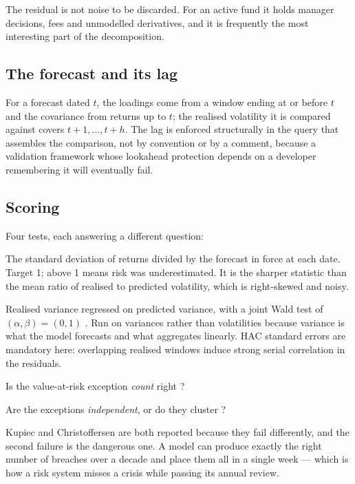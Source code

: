 \documentclass[11pt,a4paper]{article}
\begin{document}
The residual is not noise to be discarded. For an active fund it holds manager
decisions, fees and unmodelled derivatives, and it is frequently the most interesting
part of the decomposition.

\subsection{The forecast and its lag}

For a forecast dated $t$, the loadings come from a window ending at or before $t$ and
the covariance from returns up to $t$; the realised volatility it is compared against
covers $t+1,\dots,t+h$. The lag is enforced structurally in the query that assembles
the comparison, not by convention or by a comment, because a validation framework
whose lookahead protection depends on a developer remembering it will eventually
fail.

\subsection{Scoring}

Four tests, each answering a different question:

\begin{description}[leftmargin=1.6em,style=nextline,itemsep=0.4ex]
\item[Bias statistic.] The standard deviation of returns divided by the forecast in
  force at each date. Target 1; above 1 means risk was underestimated. It is the
  sharper statistic than the mean ratio of realised to predicted volatility, which is
  right-skewed and noisy.
\item[Mincer-Zarnowitz.] Realised variance regressed on predicted variance, with a
  joint Wald test of $(\alpha,\beta) = (0,1)$ \citep{mincer1969}. Run on variances
  rather than volatilities because variance is what the model forecasts and what
  aggregates linearly. HAC standard errors are mandatory here: overlapping realised
  windows induce strong serial correlation in the residuals.
\item[Kupiec.] Is the value-at-risk exception \emph{count} right \citep{kupiec1995}?
\item[Christoffersen.] Are the exceptions \emph{independent}, or do they cluster
  \citep{christoffersen1998}?
\end{description}

Kupiec and Christoffersen are both reported because they fail differently, and the
second failure is the dangerous one. A model can produce exactly the right number of
breaches over a decade and place them all in a single week --- which is how a risk
system misses a crisis while passing its annual review.
\end{document}
